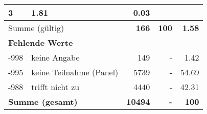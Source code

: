 \begin{longtable}{lXrrr}
       \num{3} &
       \num[round-mode=places,round-precision=2]{1,81} &
         \num[round-mode=places,round-precision=2]{0,03} \\
     \midrule
     \multicolumn{2}{l}{Summe (gültig)} &
       \textbf{\num{166}} &
     \textbf{100} &
       \textbf{\num[round-mode=places,round-precision=2]{1,58}} \\
     \multicolumn{5}{l}{\textbf{Fehlende Werte}}\\
       -998 &
       keine Angabe &
         \num{149} &
        - &
         \num[round-mode=places,round-precision=2]{1,42} \\
       -995 &
       keine Teilnahme (Panel) &
         \num{5739} &
        - &
         \num[round-mode=places,round-precision=2]{54,69} \\
       -988 &
       trifft nicht zu &
         \num{4440} &
        - &
         \num[round-mode=places,round-precision=2]{42,31} \\
     \midrule
     \multicolumn{2}{l}{\textbf{Summe (gesamt)}} &
          \textbf{\num{10494}} &
        \textbf{-} &
        \textbf{100} \\
     \bottomrule
     \end{longtable}
     
